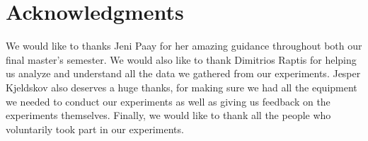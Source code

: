 \section{Acknowledgments}\label{sec:acknowledgment}
We would like to thanks Jeni Paay for her amazing guidance throughout both our final master's semester.
We would also like to thank Dimitrios Raptis for helping us analyze and understand all the data we gathered from our experiments.
Jesper Kjeldskov also deserves a huge thanks, for making sure we had all the equipment we needed to conduct our experiments as well as giving us feedback on the experiments themselves.
Finally, we would like to thank all the people who voluntarily took part in our experiments.   